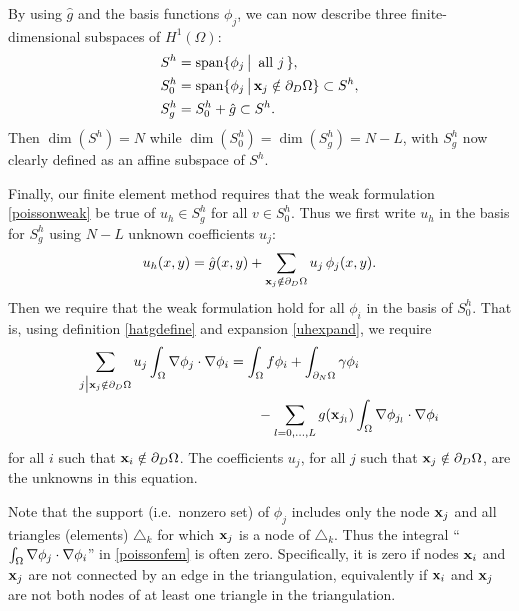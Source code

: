 By using $\hat g$ and the basis functions $\phi_j$, we can now describe three finite-dimensional subspaces of $H^1(\Omega)$:
\begin{align*}
S^h &= \operatorname{span}\{\phi_j \,\big|\, \text{ all } j\,\}, \\
S_0^h &= \operatorname{span}\{\phi_j \,\big|\, \mathbf{x}_j \notin \partial_D \Omega\} \subset S^h, \\
S_g^h &= S_0^h + \hat g \subset S^h.
\end{align*}
Then $\dim(S^h)=N$ while $\dim(S_0^h)=\dim(S_g^h)=N-L$, with $S_g^h$ now clearly defined as an affine subspace of $S^h$.

Finally, our finite element method requires that the weak formulation  \eqref{poissonweak} be true of $u_h\in S_g^h$ for all $v\in S_0^h$.  Thus we first write $u_h$ in the basis for $S_g^h$ using $N-L$ unknown coefficients $u_j$:
\begin{equation}
u_h(x,y) = \hat g(x,y) + \sum_{\mathbf{x}_j \notin \partial_D \Omega} u_j\, \phi_j(x,y). \label{uhexpand}
\end{equation}
Then we require that the weak formulation hold for all $\phi_i$ in the basis of $S_0^h$.  That is, using definition \eqref{hatgdefine} and expansion \eqref{uhexpand}, we require
\begin{align}
\sum_{j\big|\mathbf{x}_j \notin \partial_D \Omega} u_j \int_\Omega \nabla \phi_j \cdot \nabla \phi_i &= \int_\Omega f \phi_i + \int_{\partial_N\Omega} \gamma \phi_i \label{poissonfem} \\
&\qquad - \sum_{l=0,\dots,L} g(\mathbf{x}_{j_l})  \int_\Omega \nabla \phi_{j_l} \cdot \nabla \phi_i \notag
\end{align}
for all $i$ such that $\mathbf{x}_i \notin \partial_D \Omega$.  The coefficients $u_j$, for all $j$ such that $\mathbf{x}_j \notin \partial_D \Omega$, are the unknowns in this equation.

Note that the support (i.e.~nonzero set) of $\phi_j$ includes only the node $\mathbf{x}_j$ and all triangles (elements) $\triangle_k$ for which $\mathbf{x}_j$ is a node of $\triangle_k$.  Thus the integral ``$\int_\Omega \nabla \phi_j \cdot \nabla \phi_i$'' in \eqref{poissonfem} is often zero.  Specifically, it is zero if nodes $\mathbf{x}_i$ and $\mathbf{x}_j$ are not connected by an edge in the triangulation, equivalently if $\mathbf{x}_i$ and $\mathbf{x}_j$ are not both nodes of at least one triangle in the triangulation.



